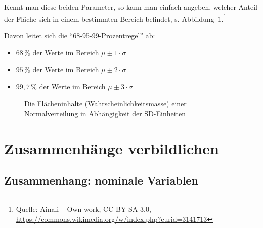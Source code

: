 \documentclass[
  a4paper,
  DIV=11]{scrreprt}
\providecommand{\tightlist}{%
  \setlength{\itemsep}{0pt}\setlength{\parskip}{0pt}}\usepackage{longtable,booktabs,array}
\theoremstyle{definition}
\theoremstyle{definition}
\theoremstyle{definition}
\theoremstyle{remark}
\begin{document}
Kennt man diese beiden Parameter, so kann man einfach angeben, welcher
Anteil der Fläche sich in einem bestimmten Bereich befindet, s.
Abbildung~\ref{fig-norm-perc}.\footnote{Quelle: Ainali -- Own work, CC
  BY-SA 3.0,
  \url{https://commons.wikimedia.org/w/index.php?curid=3141713}}

Davon leitet sich die ``68-95-99-Prozentregel'' ab:

\begin{itemize}
\tightlist
\item
  \(68\,\%\) der Werte im Bereich \(\mu\pm 1 \cdot \sigma\)
\item
  \(95\,\%\) der Werte im Bereich \(\mu\pm 2 \cdot \sigma\)
\item
  \(99{,}7\,\%\) der Werte im Bereich \(\mu\pm 3 \cdot \sigma\)
\end{itemize}

\begin{figure}


\caption{\label{fig-norm-perc}Die Flächeninhalte
(Wahrscheinlichkeitsmasse) einer Normalverteilung in Abhängigkeit der
SD-Einheiten}

\end{figure}%

\section{Zusammenhänge
verbildlichen}\label{zusammenhuxe4nge-verbildlichen}

\subsection{Zusammenhang: nominale
Variablen}\label{zusammenhang-nominale-variablen}
\end{document}
